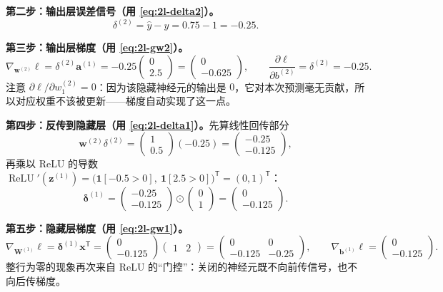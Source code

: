 \documentclass[UTF8,a4paper,11pt]{ctexart}
\theoremstyle{definition}
\theoremstyle{plain}
\theoremstyle{remark}
\DeclareMathOperator{\ReLU}{ReLU}
\newcommand{\T}{^{\mathsf{T}}}
\begin{document}
\textbf{第二步：输出层误差信号（用 \eqref{eq:2l-delta2}）。}
\[
  \delta^{(2)}=\hat y-y=0.75-1=-0.25 .
\]

\textbf{第三步：输出层梯度（用 \eqref{eq:2l-gw2}）。}
\[
  \nabla_{\bm{w}^{(2)}}\ell=\delta^{(2)}\bm{a}^{(1)}=-0.25\begin{pmatrix}0\\2.5\end{pmatrix}
  =\begin{pmatrix}0\\-0.625\end{pmatrix},
  \qquad
  \frac{\partial\ell}{\partial b^{(2)}}=\delta^{(2)}=-0.25 .
\]
注意 $\partial\ell/\partial w^{(2)}_1=0$：因为该隐藏神经元的输出是 $0$，它对本次预测毫无贡献，所以对应权重不该被更新——梯度自动实现了这一点。

\textbf{第四步：反传到隐藏层（用 \eqref{eq:2l-delta1}）。}先算线性回传部分
\[
  \bm{w}^{(2)}\delta^{(2)}=\begin{pmatrix}1\\0.5\end{pmatrix}(-0.25)=\begin{pmatrix}-0.25\\-0.125\end{pmatrix},
\]
再乘以 ReLU 的导数 $\ReLU'(\bm{z}^{(1)})=\big(\bm{1}[-0.5>0],\ \bm{1}[2.5>0]\big)\T=(0,1)\T$：
\[
  \bm{\delta}^{(1)}=\begin{pmatrix}-0.25\\-0.125\end{pmatrix}\odot\begin{pmatrix}0\\1\end{pmatrix}
  =\begin{pmatrix}0\\-0.125\end{pmatrix}.
\]

\textbf{第五步：隐藏层梯度（用 \eqref{eq:2l-gw1}）。}
\[
  \nabla_{\bm{W}^{(1)}}\ell=\bm{\delta}^{(1)}\bm{x}\T
  =\begin{pmatrix}0\\-0.125\end{pmatrix}\begin{pmatrix}1&2\end{pmatrix}
  =\begin{pmatrix}0&0\\-0.125&-0.25\end{pmatrix},
  \qquad
  \nabla_{\bm{b}^{(1)}}\ell=\begin{pmatrix}0\\-0.125\end{pmatrix}.
\]
整行为零的现象再次来自 ReLU 的“门控”：关闭的神经元既不向前传信号，也不向后传梯度。
\end{document}
